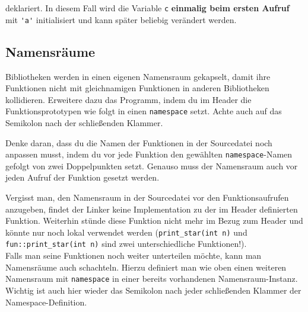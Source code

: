 
deklariert.
In diesem Fall wird die Variable \lstinline{c} \textbf{einmalig beim ersten Aufruf} mit \lstinline{'a'} initialisiert und kann später beliebig verändert werden.


\subsection{Namensräume}
Bibliotheken werden in einen eigenen Namensraum gekapselt, damit ihre Funktionen nicht mit gleichnamigen Funktionen in anderen Bibliotheken kollidieren.
Erweitere dazu das Programm, indem du im Header die Funktionsprototypen wie
folgt in einen \lstinline{namespace} setzt. Achte auch auf das Semikolon nach der schließenden Klammer.


Denke daran, dass du die Namen der Funktionen in der Sourcedatei noch anpassen musst, indem du vor jede Funktion den gewählten \lstinline{namespace}-Namen gefolgt von zwei Doppelpunkten setzt.
Genauso muss der Namensraum auch vor jeden Aufruf der Funktion gesetzt werden.


Vergisst man, den Namensraum in der Sourcedatei vor den Funktionsaufrufen anzugeben, findet der Linker keine Implementation zu der im Header definierten Funktion.
Weiterhin stünde diese Funktion nicht mehr im Bezug zum Header und könnte nur noch lokal verwendet werden (\lstinline{print_star(int n)} und \lstinline{fun::print_star(int n)} sind zwei unterschiedliche Funktionen!). \\

Falls man seine Funktionen noch weiter unterteilen möchte, kann man Namensräume auch schachteln.
Hierzu definiert man wie oben einen weiteren Namensraum mit \lstinline{namespace} in einer bereits vorhandenen Namensraum-Instanz. Wichtig ist auch hier wieder das Semikolon nach jeder schließenden Klammer der Namespace-Definition.


